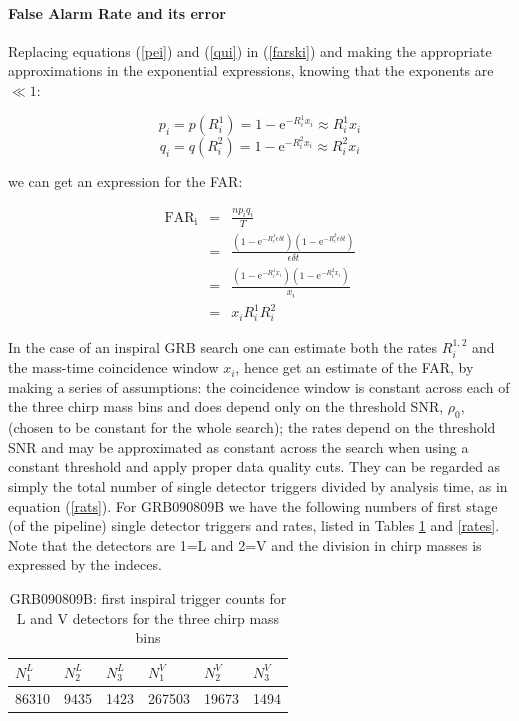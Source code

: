 \documentclass[epsf]{article}
\begin{document}
\paragraph{False Alarm Rate and its error}
Replacing equations (\ref{pei}) and (\ref{qui}) in (\ref{farski}) and making the appropriate approximations in the exponential expressions, knowing that the exponents are $\ll 1$:

\begin{equation}
p_i = p(R_{i}^1) = 1- \mathrm{e}^{-R_{i}^1 x_i} \approx R_{i}^1 x_i
\end{equation}
\begin{equation}
q_i = q(R_{i}^2) = 1- \mathrm{e}^{-R_{i}^2 x_i} \approx R_{i}^2 x_i
\end{equation}

we can get an expression for the FAR:

\begin{eqnarray}
\label{faar}
\mathrm{FAR_i} &=& \frac{np_iq_i}{T} \nonumber\\
               &=& \frac{(1- \mathrm{e}^{-R_{i}^1 \epsilon \delta t})(1- \mathrm{e}^{-R_{i}^2 \epsilon \delta t})}{\epsilon \delta t} \nonumber\\
               &=& \frac{(1- \mathrm{e}^{-R_{i}^1 x_i})(1- \mathrm{e}^{-R_{i}^2 x_i})}{x_i} \nonumber\\
               &=& x_iR_{i}^1 R_{i}^2                
\end{eqnarray}

In the case of an inspiral GRB search one can estimate both the rates $R_{i}^{1,2}$ and the mass-time coincidence window $x_i$, hence get an estimate of the FAR, by making a series of assumptions: the coincidence window is constant across each of the three chirp mass bins and does depend only on the threshold SNR, $\rho_0$, (chosen to be constant for the whole search); the rates depend on the threshold SNR and may be approximated as constant across the search when using a constant threshold and apply proper data quality cuts. They can be regarded as simply the total number of single detector triggers divided by analysis time, as in equation (\ref{rats}). For GRB090809B we have the following numbers of first stage (of the pipeline) single detector triggers and rates, listed in Tables \ref{triggers} and \ref{rates}. Note that the detectors are 1=L and 2=V and the division in chirp masses is expressed by the indeces.

\begin{table}[ht]
 \begin{tabular}{|l|l|l|l|l|l|}
 \hline
 \hline
 $N_{1}^L$ & $N_{2}^L$ & $N_{3}^L$ & $N_{1}^V$ & $N_{2}^V$ & $N_{3}^V$ \\
 \hline
 86310 & 9435 & 1423 & 267503 & 19673 & 1494 \\
 \hline
 \hline
 \end{tabular} 
 \caption{GRB090809B: first inspiral trigger counts for L and V detectors for the three chirp mass bins}
 \label{triggers}
\end{table}
\end{document}
